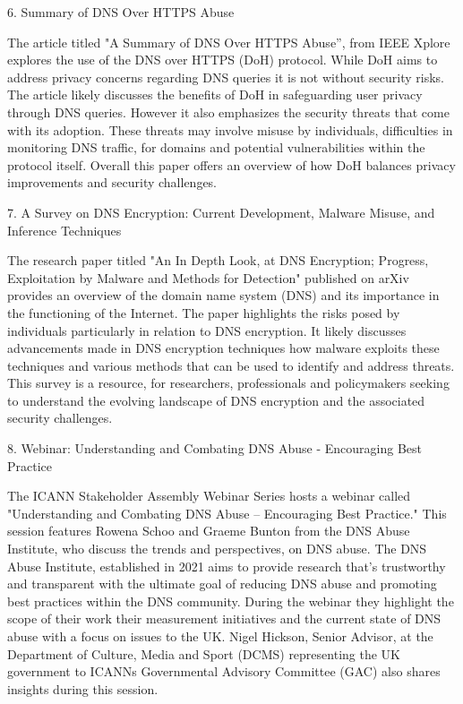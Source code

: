 6. Summary of DNS Over HTTPS Abuse

The article titled "A Summary of DNS Over HTTPS Abuse”, from IEEE Xplore explores the use of the DNS over HTTPS (DoH) protocol. While DoH aims to address privacy concerns regarding DNS queries it is not without security risks. The article likely discusses the benefits of DoH in safeguarding user privacy through DNS queries. However it also emphasizes the security threats that come with its adoption. These threats may involve misuse by individuals, difficulties in monitoring DNS traffic, for domains and potential vulnerabilities within the protocol itself.\cite{ieee2023dohabuse} Overall this paper offers an overview of how DoH balances privacy improvements and security challenges.


7. A Survey on DNS Encryption: Current Development, Malware Misuse, and Inference Techniques

The research paper titled "An In Depth Look, at DNS Encryption; Progress, Exploitation by Malware and Methods for Detection" published on arXiv provides an overview of the domain name system (DNS) and its importance in the functioning of the Internet. The paper highlights the risks posed by individuals particularly in relation to DNS encryption. It likely discusses advancements made in DNS encryption techniques how malware exploits these techniques and various methods that can be used to identify and address threats. \cite{arxiv2023dnsencryption} This survey is a resource, for researchers, professionals and policymakers seeking to understand the evolving landscape of DNS encryption and the associated security challenges.




8. Webinar: Understanding and Combating DNS Abuse - Encouraging Best Practice

The ICANN Stakeholder Assembly Webinar Series hosts a webinar called "Understanding and Combating DNS Abuse – Encouraging Best Practice." This session features Rowena Schoo and Graeme Bunton from the DNS Abuse Institute, who discuss the trends and perspectives, on DNS abuse. The DNS Abuse Institute, established in 2021 aims to provide research that's trustworthy and transparent with the ultimate goal of reducing DNS abuse and promoting best practices within the DNS community. During the webinar they highlight the scope of their work their measurement initiatives and the current state of DNS abuse with a focus on issues to the UK. \cite{icann2023webinar} Nigel Hickson, Senior Advisor, at the Department of Culture, Media and Sport (DCMS) representing the UK government to ICANNs Governmental Advisory Committee (GAC) also shares insights during this session.



